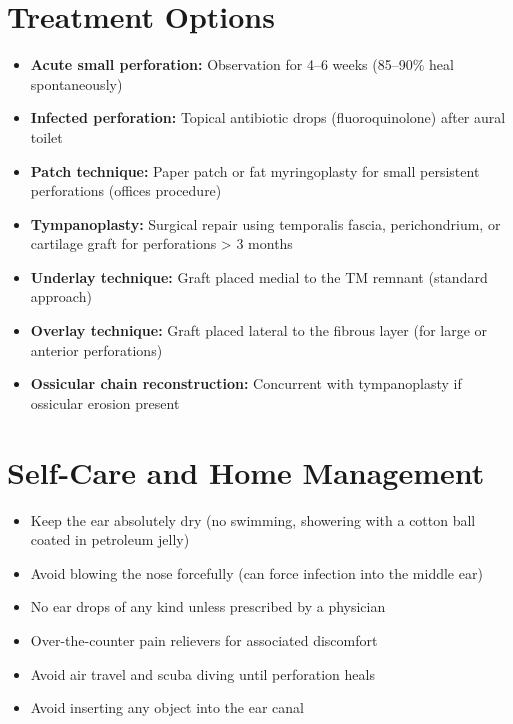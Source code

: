 \section*{Treatment Options}
\begin{itemize}
  \item \textbf{Acute small perforation:} Observation for 4--6 weeks (85--90\% heal spontaneously)
  \item \textbf{Infected perforation:} Topical antibiotic drops (fluoroquinolone) after aural toilet
  \item \textbf{Patch technique:} Paper patch or fat myringoplasty for small persistent perforations (offices procedure)
  \item \textbf{Tympanoplasty:} Surgical repair using temporalis fascia, perichondrium, or cartilage graft for perforations > 3 months
  \item \textbf{Underlay technique:} Graft placed medial to the TM remnant (standard approach)
  \item \textbf{Overlay technique:} Graft placed lateral to the fibrous layer (for large or anterior perforations)
  \item \textbf{Ossicular chain reconstruction:} Concurrent with tympanoplasty if ossicular erosion present
\end{itemize}

\section*{Self-Care and Home Management}
\begin{itemize}
  \item Keep the ear absolutely dry (no swimming, showering with a cotton ball coated in petroleum jelly)
  \item Avoid blowing the nose forcefully (can force infection into the middle ear)
  \item No ear drops of any kind unless prescribed by a physician
  \item Over-the-counter pain relievers for associated discomfort
  \item Avoid air travel and scuba diving until perforation heals
  \item Avoid inserting any object into the ear canal
\end{itemize}

